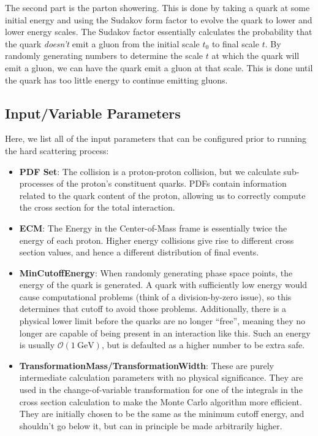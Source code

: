 The second part is the parton showering. This is done by taking a quark at some initial energy and using the Sudakov form factor to evolve the quark to lower and lower energy scales. The Sudakov factor essentially calculates the probability that the quark \textit{doesn't} emit a gluon from the initial scale $t_0$ to final scale $t$. By randomly generating numbers to determine the scale $t$ at which the quark will emit a gluon, we can have the quark emit a gluon at that scale. This is done until the quark has too little energy to continue emitting gluons.

\subsection{Input/Variable Parameters}

Here, we list all of the input parameters that can be configured prior to running the hard scattering process:

\begin{itemize}
\item \textbf{PDF Set}: The collision is a proton-proton collision, but we calculate sub-processes of the proton's constituent quarks. PDFs contain information related to the quark content of the proton, allowing us to correctly compute the cross section for the total interaction.
\item \textbf{ECM}: The Energy in the Center-of-Mass frame is essentially twice the energy of each proton. Higher energy collisions give rise to different cross section values, and hence a different distribution of final events.
\item \textbf{MinCutoffEnergy}: When randomly generating phase space points, the energy of the quark is generated. A quark with sufficiently low energy would cause computational problems (think of a division-by-zero issue), so this determines that cutoff to avoid those problems. Additionally, there is a physical lower limit before the quarks are no longer ``free'', meaning they no longer are capable of being present in an interaction like this. Such an energy is usually $\mathcal{O}(\qty{1}{\giga\electronvolt})$, but is defaulted as a higher number to be extra safe.
\item \textbf{TransformationMass/TransformationWidth}: These are purely intermediate calculation parameters with no physical significance. They are used in the change-of-variable transformation for one of the integrals in the cross section calculation to make the Monte Carlo algorithm more efficient. They are initially chosen to be the same as the minimum cutoff energy, and shouldn't go below it, but can in principle be made arbitrarily higher.
\end{itemize}

